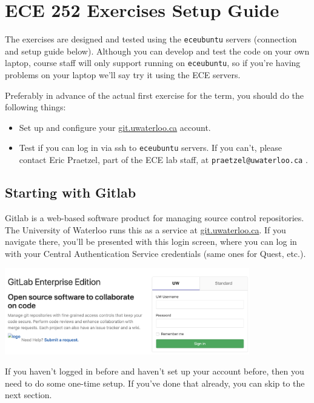 



\section*{ECE 252 Exercises Setup Guide}

The exercises are designed and tested using the \texttt{eceubuntu} servers (connection and setup guide below). Although you can develop and test the code on your own laptop, course staff will only support running on \texttt{eceubuntu}, so if you're having problems on your laptop we'll say try it using the ECE servers.

Preferably in advance of the actual first exercise for the term, you should do the following things:
\begin{itemize}
	\item Set up and configure your \url{git.uwaterloo.ca} account.
	\item Test if you can log in via ssh to \texttt{eceubuntu} servers. If you can't, please contact Eric Praetzel, part of the ECE lab staff,  at \texttt{praetzel@uwaterloo.ca} .
\end{itemize}

\subsection*{Starting with Gitlab}
Gitlab is a web-based software product for managing source control repositories. The University of Waterloo runs this as a service at \url{git.uwaterloo.ca}. If you navigate there, you'll be presented with this login screen, where you can log in with your Central Authentication Service credentials (same ones for Quest, etc.).

\begin{center}
	\includegraphics[width=0.8\textwidth]{images/gitlab-login.png}
\end{center}

If you haven't logged in before and haven't set up your account before, then you need to do some one-time setup. If you've done that already, you can skip to the next section.


